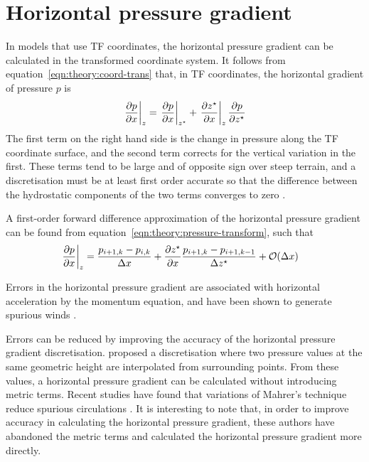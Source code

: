\section{Horizontal pressure gradient}
\label{sec:horizPressureGrad}

In models that use TF coordinates, the horizontal pressure gradient can be calculated in the transformed coordinate system.  It follows from equation~\ref{eqn:theory:coord-trans} that, in TF coordinates, the horizontal gradient of pressure $p$ is \autocite{mahrer1984}
\begin{align}
	\left. \frac{\partial p}{\partial x} \right|_z = 
	\left. \frac{\partial p}{\partial x} \right|_{z^\star} + 
	\left. \frac{\partial {z^\star}}{\partial x} \right|_z
	\frac{\partial p}{\partial {z^\star}} \label{eqn:theory:pressure-transform}
\end{align}
The first term on the right hand side is the change in pressure along the TF coordinate surface, and the second term corrects for the vertical variation in the first.  These terms tend to be large and of opposite sign over steep terrain, and a discretisation must be at least first order accurate so that the difference between the hydrostatic components of the two terms converges to zero \autocite{gary1973}.

A first-order forward difference approximation of the horizontal pressure gradient can be found from equation~\ref{eqn:theory:pressure-transform}, such that
\begin{align}
	\left. \frac{\partial p}{\partial x} \right|_z &= \frac{p_{i+1,k} - p_{i,k}}{\Delta x} + \frac{\partial {z^\star}}{\partial x} \frac{p_{i+1,k} - p_{i+1,k-1}}{\Delta {z^\star}} + \mathcal{O}(\Delta x)
\end{align}

Errors in the horizontal pressure gradient are associated with horizontal acceleration by the momentum equation, and have been shown to generate spurious winds \parencites{klemp2003}{klemp2011}.

Errors can be reduced by improving the accuracy of the horizontal pressure gradient discretisation.  \textcite{mahrer1984} proposed a discretisation where two pressure values at the same geometric height are interpolated from surrounding points.  From these values, a horizontal pressure gradient can be calculated without introducing metric terms.  Recent studies have found that variations of Mahrer's technique reduce spurious circulations \parencites{dempsey-davis1998}{klemp2011}{zaengl2012}.  It is interesting to note that, in order to improve accuracy in calculating the horizontal pressure gradient, these authors have abandoned the metric terms and calculated the horizontal pressure gradient more directly.
